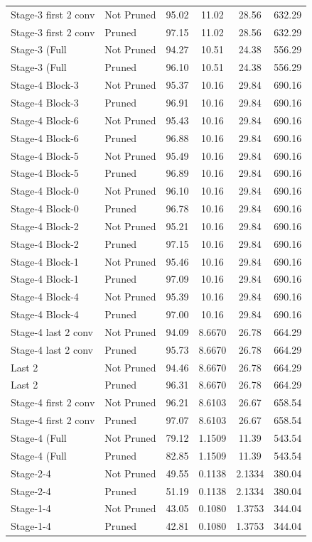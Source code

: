 \begin{table}
\begin{tabular}{llcccc}
Stage-3 first 2 conv & Not Pruned & 95.02 & 11.02 & 28.56 & 632.29 \\
Stage-3 first 2 conv & Pruned & 97.15 & 11.02 & 28.56 & 632.29 \\
Stage-3 (Full & Not Pruned & 94.27 & 10.51 & 24.38 & 556.29 \\
Stage-3 (Full & Pruned & 96.10 & 10.51 & 24.38 & 556.29 \\
Stage-4 Block-3 & Not Pruned & 95.37 & 10.16 & 29.84 & 690.16 \\
Stage-4 Block-3 & Pruned & 96.91 & 10.16 & 29.84 & 690.16 \\
Stage-4 Block-6 & Not Pruned & 95.43 & 10.16 & 29.84 & 690.16 \\
Stage-4 Block-6 & Pruned & 96.88 & 10.16 & 29.84 & 690.16 \\
Stage-4 Block-5 & Not Pruned & 95.49 & 10.16 & 29.84 & 690.16 \\
Stage-4 Block-5 & Pruned & 96.89 & 10.16 & 29.84 & 690.16 \\
Stage-4 Block-0 & Not Pruned & 96.10 & 10.16 & 29.84 & 690.16 \\
Stage-4 Block-0 & Pruned & 96.78 & 10.16 & 29.84 & 690.16 \\
Stage-4 Block-2 & Not Pruned & 95.21 & 10.16 & 29.84 & 690.16 \\
Stage-4 Block-2 & Pruned & 97.15 & 10.16 & 29.84 & 690.16 \\
Stage-4 Block-1 & Not Pruned & 95.46 & 10.16 & 29.84 & 690.16 \\
Stage-4 Block-1 & Pruned & 97.09 & 10.16 & 29.84 & 690.16 \\
Stage-4 Block-4 & Not Pruned & 95.39 & 10.16 & 29.84 & 690.16 \\
Stage-4 Block-4 & Pruned & 97.00 & 10.16 & 29.84 & 690.16 \\
Stage-4 last 2 conv & Not Pruned & 94.09 & 8.6670 & 26.78 & 664.29 \\
Stage-4 last 2 conv & Pruned & 95.73 & 8.6670 & 26.78 & 664.29 \\
Last 2 & Not Pruned & 94.46 & 8.6670 & 26.78 & 664.29 \\
Last 2 & Pruned & 96.31 & 8.6670 & 26.78 & 664.29 \\
Stage-4 first 2 conv & Not Pruned & 96.21 & 8.6103 & 26.67 & 658.54 \\
Stage-4 first 2 conv & Pruned & 97.07 & 8.6103 & 26.67 & 658.54 \\
Stage-4 (Full & Not Pruned & 79.12 & 1.1509 & 11.39 & 543.54 \\
Stage-4 (Full & Pruned & 82.85 & 1.1509 & 11.39 & 543.54 \\
Stage-2-4 & Not Pruned & 49.55 & 0.1138 & 2.1334 & 380.04 \\
Stage-2-4 & Pruned & 51.19 & 0.1138 & 2.1334 & 380.04 \\
Stage-1-4 & Not Pruned & 43.05 & 0.1080 & 1.3753 & 344.04 \\
Stage-1-4 & Pruned & 42.81 & 0.1080 & 1.3753 & 344.04 \\
\bottomrule
\end{tabular}
\end{table}
